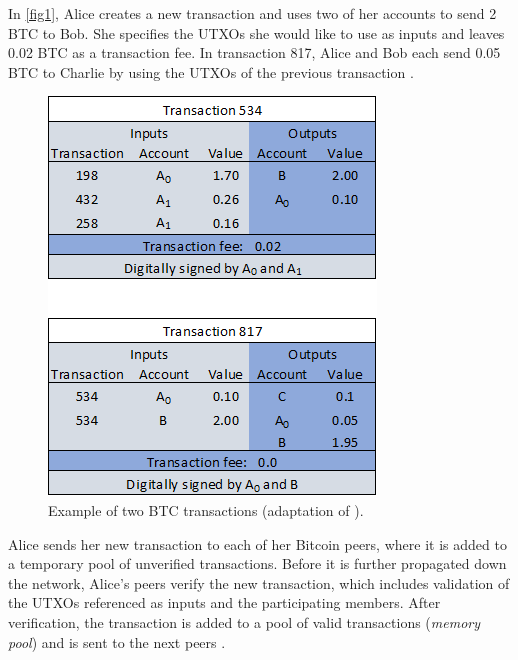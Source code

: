 \documentclass[a4paper,12pt,twoside]{report}
\begin{document}
In \autoref{fig1}, Alice creates a new transaction and uses two of her accounts to send 2 BTC to Bob. She specifies the UTXOs she would like to use as inputs and leaves 0.02 BTC as a transaction fee. In transaction 817, Alice and Bob each send 0.05 BTC to Charlie by using the UTXOs of the previous transaction \cite{DSAwithTime}.
\begin{figure}[ht]
	\centering
  \includegraphics[scale=0.7]{TransactionExample.png}
	\caption{Example of two BTC transactions (adaptation of \cite{DSAwithTime}).}
	\label{fig1}
\end{figure}

Alice sends her new transaction to each of her Bitcoin peers, where it is added to a temporary pool of unverified transactions. Before it is further propagated down the network, Alice's peers verify the new transaction, which includes validation of the UTXOs referenced as inputs and the participating members. After verification, the transaction is added to a pool of valid transactions (\textit{memory pool}) and is sent to the next peers \cite{antonopoulos2017mastering}.
\end{document}
